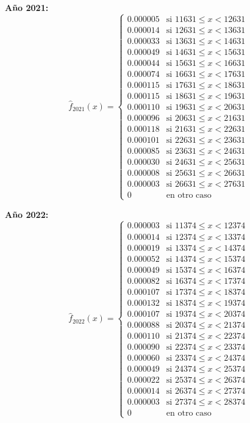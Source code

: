 \documentclass[11pt,a4paper]{article}
\begin{document}
\textbf{Año 2021:}
\[
\hat{f}_{2021}(x) = \begin{cases}
0.000005 & \text{si } 11631 \leq x < 12631 \\
0.000014 & \text{si } 12631 \leq x < 13631 \\
0.000033 & \text{si } 13631 \leq x < 14631 \\
0.000049 & \text{si } 14631 \leq x < 15631 \\
0.000044 & \text{si } 15631 \leq x < 16631 \\
0.000074 & \text{si } 16631 \leq x < 17631 \\
0.000115 & \text{si } 17631 \leq x < 18631 \\
0.000115 & \text{si } 18631 \leq x < 19631 \\
0.000110 & \text{si } 19631 \leq x < 20631 \\
0.000096 & \text{si } 20631 \leq x < 21631 \\
0.000118 & \text{si } 21631 \leq x < 22631 \\
0.000101 & \text{si } 22631 \leq x < 23631 \\
0.000085 & \text{si } 23631 \leq x < 24631 \\
0.000030 & \text{si } 24631 \leq x < 25631 \\
0.000008 & \text{si } 25631 \leq x < 26631 \\
0.000003 & \text{si } 26631 \leq x < 27631 \\
0 & \text{en otro caso}
\end{cases}
\]

\textbf{Año 2022:}
\[
\hat{f}_{2022}(x) = \begin{cases}
0.000003 & \text{si } 11374 \leq x < 12374 \\
0.000014 & \text{si } 12374 \leq x < 13374 \\
0.000019 & \text{si } 13374 \leq x < 14374 \\
0.000052 & \text{si } 14374 \leq x < 15374 \\
0.000049 & \text{si } 15374 \leq x < 16374 \\
0.000082 & \text{si } 16374 \leq x < 17374 \\
0.000107 & \text{si } 17374 \leq x < 18374 \\
0.000132 & \text{si } 18374 \leq x < 19374 \\
0.000107 & \text{si } 19374 \leq x < 20374 \\
0.000088 & \text{si } 20374 \leq x < 21374 \\
0.000110 & \text{si } 21374 \leq x < 22374 \\
0.000090 & \text{si } 22374 \leq x < 23374 \\
0.000060 & \text{si } 23374 \leq x < 24374 \\
0.000049 & \text{si } 24374 \leq x < 25374 \\
0.000022 & \text{si } 25374 \leq x < 26374 \\
0.000014 & \text{si } 26374 \leq x < 27374 \\
0.000003 & \text{si } 27374 \leq x < 28374 \\
0 & \text{en otro caso}
\end{cases}
\]
\end{document}
